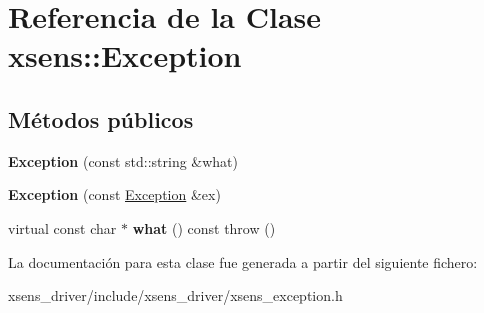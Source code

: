\hypertarget{classxsens_1_1Exception}{\section{\-Referencia de la \-Clase xsens\-:\-:\-Exception}
\label{classxsens_1_1Exception}
}
\subsection*{\-Métodos públicos}
\begin{DoxyCompactItemize}
\item 
\hypertarget{classxsens_1_1Exception_acd82158b8e4697e3a271555a8ea5049b}{{\bfseries \-Exception} (const std\-::string \&what)}\label{classxsens_1_1Exception_acd82158b8e4697e3a271555a8ea5049b}

\item 
\hypertarget{classxsens_1_1Exception_a64dc5acf4db2b1dc141e771dbb2c9034}{{\bfseries \-Exception} (const \hyperlink{classxsens_1_1Exception}{\-Exception} \&ex)}\label{classxsens_1_1Exception_a64dc5acf4db2b1dc141e771dbb2c9034}

\item 
\hypertarget{classxsens_1_1Exception_ac98e6d523db09bae3eb76999290e58ff}{virtual const char $\ast$ {\bfseries what} () const   throw ()}\label{classxsens_1_1Exception_ac98e6d523db09bae3eb76999290e58ff}

\end{DoxyCompactItemize}


\-La documentación para esta clase fue generada a partir del siguiente fichero\-:\begin{DoxyCompactItemize}
\item 
xsens\-\_\-driver/include/xsens\-\_\-driver/xsens\-\_\-exception.\-h\end{DoxyCompactItemize}
